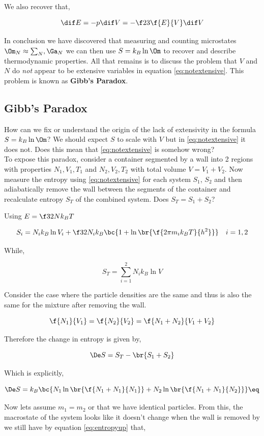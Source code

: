 \documentclass{article}
\begin{document}
We also recover that,

\[ \dif E = -p \dif V = -\f23 \f{E}{V} \dif V \]

In conclusion we have discovered that measuring and counting microstates $\Om_N \approx \sum_N, \Ga_N$ we can then use $S = k_B \ln \Om$ to recover and describe thermodynamic properties. All that remains is to discuss the problem that $V$ and $N$ do \textit{not} appear to be extensive variables in equation \eqref{eq:notextensive}. This problem is known as \textbf{Gibb's Paradox}.

\subsection{Gibb's Paradox}
How can we fix or understand the origin of the lack of extensivity in the formula $S = k_B \ln \Om$? We should expect $S$ to scale with $V$ but in \eqref{eq:notextensive} it does not. Does this mean that \eqref{eq:notextensive} is somehow wrong? \\

To expose this paradox, consider a container segmented by a wall into 2 regions with properties $N_1, V_1, T_1$ and $N_2, V_2, T_2$ with total volume $V = V_1 + V_2$. Now measure the entropy using \eqref{eq:notextensive} for each system $S_1$, $S_2$ and then adiabatically remove the wall between the segments of the container and recalculate entropy $S_T$ of the combined system. Does $S_T = S_1 + S_2$?

Using $E = \f32 N k_B T$

\[ S_i = N_i k_B \ln V_i + \f32 N_i k_B \bc{1 + \ln\br{\f{2 \pi m_i k_B T}{h^2}}} \quad i = 1,2 \]

While,

\[ S_T = \sum_{i=1}^{2} N_i k_B \ln V\]

Consider the case where the particle densities are the same and thus is also the same for the mixture after removing the wall.

\[ \f{N_1}{V_1} = \f{N_2}{V_2} = \f{N_1+ N_2}{V_1 + V_2} \]

Therefore the change in entropy is given by,

\[ \De S = S_T - \br{S_1 + S_2} \]

Which is explicitly,

\[ \De S = k_B \bc{N_1 \ln\br{\f{N_1 + N_1}{N_1}} + N_2\ln\br{\f{N_1 + N_1}{N_2}}} \eq \label{eq:entropyup} \]

Now lets assume $m_1 = m_2$ or that we have identical particles. From this, the macrostate of the system looks like it doesn't change when the wall is removed by we still have by equation \eqref{eq:entropyup} that,
\end{document}
